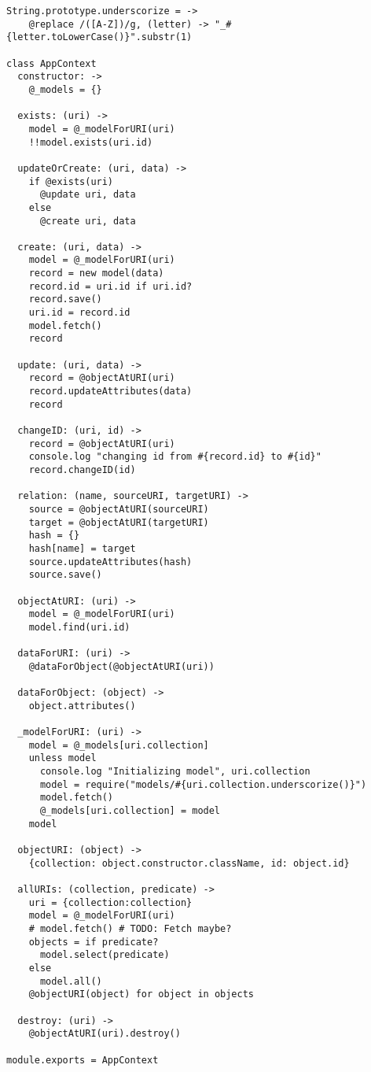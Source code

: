 \begin{lstlisting}[caption=app_context.coffee]
String.prototype.underscorize = ->
	@replace /([A-Z])/g, (letter) -> "_#{letter.toLowerCase()}".substr(1)

class AppContext
  constructor: ->
    @_models = {}
  
  exists: (uri) ->
    model = @_modelForURI(uri)
    !!model.exists(uri.id)
  
  updateOrCreate: (uri, data) ->
    if @exists(uri)
      @update uri, data
    else
      @create uri, data
  
  create: (uri, data) ->
    model = @_modelForURI(uri)
    record = new model(data)
    record.id = uri.id if uri.id?
    record.save()
    uri.id = record.id
    model.fetch()
    record
  
  update: (uri, data) ->
    record = @objectAtURI(uri)
    record.updateAttributes(data)
    record
  
  changeID: (uri, id) ->
    record = @objectAtURI(uri)
    console.log "changing id from #{record.id} to #{id}"
    record.changeID(id)
  
  relation: (name, sourceURI, targetURI) ->
    source = @objectAtURI(sourceURI)
    target = @objectAtURI(targetURI)
    hash = {}
    hash[name] = target
    source.updateAttributes(hash)
    source.save()
  
  objectAtURI: (uri) ->
    model = @_modelForURI(uri)
    model.find(uri.id)
  
  dataForURI: (uri) ->
    @dataForObject(@objectAtURI(uri))
  
  dataForObject: (object) ->
    object.attributes()
  
  _modelForURI: (uri) ->
    model = @_models[uri.collection]
    unless model
      console.log "Initializing model", uri.collection
      model = require("models/#{uri.collection.underscorize()}")
      model.fetch()
      @_models[uri.collection] = model
    model
  
  objectURI: (object) ->
    {collection: object.constructor.className, id: object.id}
  
  allURIs: (collection, predicate) ->
    uri = {collection:collection}
    model = @_modelForURI(uri)
    # model.fetch() # TODO: Fetch maybe?
    objects = if predicate?
      model.select(predicate)
    else
      model.all()
    @objectURI(object) for object in objects
  
  destroy: (uri) ->
    @objectAtURI(uri).destroy()
  
module.exports = AppContext
\end{lstlisting}

